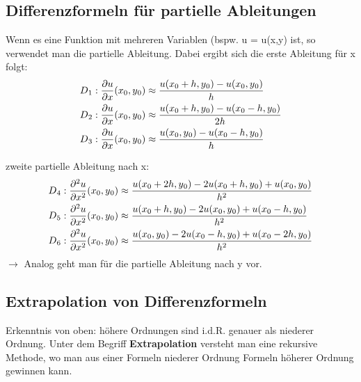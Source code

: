 \documentclass{article}
\theoremstyle{satz}
\theoremstyle{definition}
\begin{document}
\subsection{Differenzformeln für partielle Ableitungen}
Wenn es eine Funktion mit mehreren Variablen (bspw. u = u(x,y) ist, so verwendet man die partielle Ableitung. Dabei ergibt sich die erste Ableitung für x folgt:
\begin{equation}
\begin{split}
D\textsubscript{1}: \frac{\partial u}{\partial x}(x\textsubscript{0},y\textsubscript{0}) & \approx \frac{u(x\textsubscript{0}+h, y\textsubscript{0})-u(x\textsubscript{0}, y\textsubscript{0})}{h}\\
D\textsubscript{2}: \frac{\partial u}{\partial x}(x\textsubscript{0},y\textsubscript{0}) & \approx \frac{u(x\textsubscript{0}+h, y\textsubscript{0})-u(x\textsubscript{0}-h, y\textsubscript{0})}{2h}\\
D\textsubscript{3}: \frac{\partial u}{\partial x}(x\textsubscript{0},y\textsubscript{0}) & \approx \frac{u(x\textsubscript{0}, y\textsubscript{0})-u(x\textsubscript{0}-h, y\textsubscript{0})}{h}
\end{split}
\end{equation}

zweite partielle Ableitung nach x:
\begin{equation}
\begin{split}
D\textsubscript{4}: \frac{\partial ^2 u}{\partial x^2}(x\textsubscript{0},y\textsubscript{0}) & \approx \frac{u(x\textsubscript{0}+2h, y\textsubscript{0})-2u(x\textsubscript{0}+h,y\textsubscript{0})+u(x\textsubscript{0},y\textsubscript{0})}{h^2}\\
D\textsubscript{5}: \frac{\partial ^2 u}{\partial x^2}(x\textsubscript{0},y\textsubscript{0}) & \approx \frac{u(x\textsubscript{0}+h, y\textsubscript{0})-2u(x\textsubscript{0},y\textsubscript{0})+u(x\textsubscript{0}-h,y\textsubscript{0})}{h^2}\\
D\textsubscript{6}: \frac{\partial ^2 u}{\partial x^2}(x\textsubscript{0},y\textsubscript{0}) & \approx \frac{u(x\textsubscript{0}, y\textsubscript{0})-2u(x\textsubscript{0}-h,y\textsubscript{0})+u(x\textsubscript{0}-2h,y\textsubscript{0})}{h^2}
\end{split}
\end{equation}
$\rightarrow$ Analog geht man für die partielle Ableitung nach y vor.

\subsection{Extrapolation von Differenzformeln}
Erkenntnis von oben: höhere Ordnungen sind i.d.R. genauer als niederer Ordnung. Unter dem Begriff \textbf{Extrapolation} versteht man eine rekursive Methode, wo man aus einer Formeln niederer Ordnung Formeln höherer Ordnung gewinnen kann. 
\end{document}
